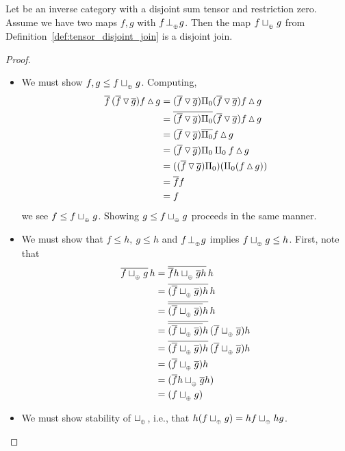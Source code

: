 \begin{proposition}\label{prop:disjointness_tensor_gives_disjoint_join}
  Let \X be an inverse category with a disjoint sum tensor and restriction zero. Assume we have two
  maps $f,g$ with $f{}_{{}_{}}{\perp_{{}_{\oplus}}} g$. Then the map $f \sqcup_{{_{\oplus}}} g$ from
  Definition~\ref{def:tensor_disjoint_join} is a disjoint join.
\end{proposition}
\begin{proof}
  \begin{itemize}
    \item [\axiom{DJ}{1}] We must show $f, g \le f \sqcup_{{_{\oplus}}} g$. Computing,
      \begin{align*}
        \overline{f}\,(\overline{f}\operatorname{\triangledown}\overline{g})  f\operatorname{\vartriangle} g
          &= (\overline{f}\operatorname{\triangledown}\overline{g}) \Pi_0 (\overline{f}\operatorname{\triangledown}\overline{g} ) f\operatorname{\vartriangle} g \\
        &=\overline{(\overline{f}\operatorname{\triangledown}\overline{g}) \Pi_0} (\overline{f}\operatorname{\triangledown}\overline{g}) f\operatorname{\vartriangle} g  \\
        &=(\overline{f}\operatorname{\triangledown}\overline{g}) \overline{\Pi_0} f\operatorname{\vartriangle} g  \\
        &=(\overline{f}\operatorname{\triangledown}\overline{g}) \Pi_0 \amalg_{0} f\operatorname{\vartriangle} g \\
        &=((\overline{f}\operatorname{\triangledown}\overline{g}) \Pi_0) (\amalg_{0} (f \operatorname{\vartriangle} g)) \\
        &= \overline{f} f \\
        &=f
      \end{align*}
      we see $f \le f \sqcup_{{_{\oplus}}} g$. Showing $g \le f \sqcup_{{_{\oplus}}} g$ proceeds in the same manner.
    \item [\axiom{DJ}{2}] We must show that $f \le h,\ g\le h$ and $f{}_{{}_{}}{\perp_{{}_{\oplus}}} g$ implies
      $f \sqcup_{{_{\oplus}}} g \le h$. First, note that
      \begin{align*}
        \overline{f \sqcup_{{_{\oplus}}} g} \,h & = \overline{\overline{f} h \sqcup_{{_{\oplus}}} \overline{g} h} \,h\\
        & = \overline{(\overline{f} \sqcup_{{_{\oplus}}} \overline{g})h} \,h\\
        & = \overline{\overline{(\overline{f} \sqcup_{{_{\oplus}}} \overline{g})}h} \,h\\
        & = \overline{\overline{(\overline{f} \sqcup_{{_{\oplus}}} \overline{g})}h}\,(\overline{f} \sqcup_{{_{\oplus}}} \overline{g})h\\
        & = \overline{(\overline{f} \sqcup_{{_{\oplus}}} \overline{g})h}\,(\overline{f} \sqcup_{{_{\oplus}}} \overline{g})h\\
        & = (\overline{f}\sqcup_{{_{\oplus}}} \overline{g})h\\
        & = (\overline{f}h\sqcup_{{_{\oplus}}} \overline{g}h)\\
        & = (f\sqcup_{{_{\oplus}}} g)
      \end{align*}
    \item [\axiom{DJ}{3}] We must show stability of $\sqcup_{{_{\oplus}}}$, i.e., that
      $h(f\sqcup_{{_{\oplus}}} g) = h f \sqcup_{{_{\oplus}}} h g$.


\end{itemize}
\end{proof}
